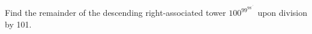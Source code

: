 Find the remainder of the descending right-associated tower $100^{99^{98^{\cdot^{\cdot^{1}}}}}$ upon division by 101.
